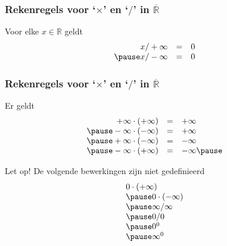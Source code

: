 \begin{frame}
\frametitle{Rekenregels voor `$\times$' en `$/$' in $\overline{\mathbb{R}}$}
\begin{eigenschap}
Voor elke $x \in \mathbb{R}$ geldt \pause
\[\begin{array}{rcl}
  x/+\infty  & = & 0\\ \pause
  x/-\infty  & = & 0   
  \end{array} \]  
 \end{eigenschap}
\end{frame}

\begin{frame}
\frametitle{Rekenregels voor `$\times$' en `$/$' in $\overline{\mathbb{R}}$}
\begin{eigenschap}
Er geldt \pause
\[\begin{array}{rcl}
  +\infty \cdot  (+\infty) & = & +\infty\\ \pause
  -\infty \cdot  (-\infty) & = & +\infty\\ \pause
  +\infty \cdot  (-\infty) & = & -\infty\\ \pause
  -\infty \cdot  (+\infty) & = & -\infty  \pause
  \end{array} \]
\end{eigenschap}
 \pause
Let op! De volgende bewerkingen zijn niet gedefinieerd
\pause
\[\begin{array}{l}
  0\cdot  (+\infty)\\ \pause
  0\cdot  (-\infty)\\  \pause
  \infty / \infty \\ \pause
  0 / 0 \\  \pause
  0^0\\ \pause
  \infty^0  
  \end{array} \]
 \end{frame}
 
 